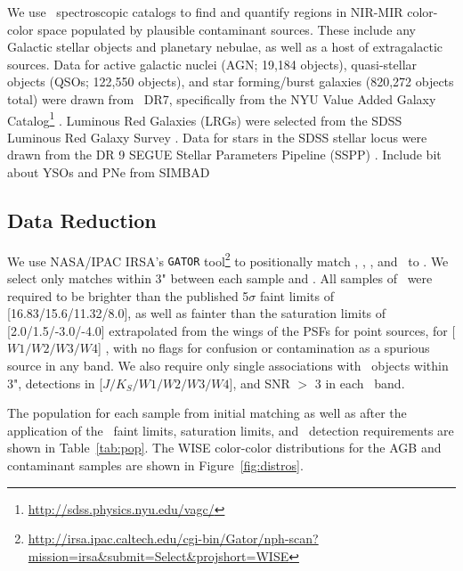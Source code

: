 We use \sdss\, spectroscopic catalogs to find and quantify regions in NIR-MIR color-color space populated by plausible contaminant sources. These include any Galactic stellar objects and planetary nebulae, as well as a host of extragalactic sources. Data for active galactic nuclei (AGN; 19,184 objects), quasi-stellar objects (QSOs; 122,550 objects), and star forming/burst galaxies (820,272 objects total) were drawn from \sdss\, DR7, specifically from the NYU Value Added Galaxy Catalog\footnote{\url{http://sdss.physics.nyu.edu/vagc/}} \citep[VAGC]{2005AJ....129.2562B}. Luminous Red Galaxies (LRGs) were selected from the SDSS Luminous Red Galaxy Survey \citep[105,631 objects, ][]{2010ApJ...710.1444K}.  Data for stars in the SDSS stellar locus were drawn from the DR 9 SEGUE Stellar Parameters Pipeline (SSPP) \citep[1,843,190 objects, ][]{2012ApJS..203...21A}. {\color{red} Include bit about YSOs and PNe from SIMBAD}

\subsection{Data Reduction}
\label{sec:reduction}
We use NASA/IPAC IRSA's {\tt GATOR} tool\footnote{\url{http://irsa.ipac.caltech.edu/cgi-bin/Gator/nph-scan?mission=irsa&submit=Select&projshort=WISE}} to positionally match \sdss, \ogle, \macho, and \simbad\, to \allwise. We select only matches within 3" between  each sample and \allwise. All samples of \agb\, were required to be brighter than the published 5$\sigma$ faint limits of [16.83/15.6/11.32/8.0], as well as fainter than the saturation limits of [2.0/1.5/-3.0/-4.0] extrapolated from the wings of the PSFs for point sources, for [$W1/W2/W3/W4$] \citep{2013wise.rept....1C}, with no flags for confusion or contamination as a spurious source in any band. We also require only single associations with \twomass\, objects within 3", detections in [$J/K_S/W1/W2/W3/W4$], and SNR $>$ 3 in each \allwise\, band. 

The population for each sample from initial matching as well as after the application of the \allwise\, faint limits, saturation limits, and \twomass\, detection requirements are shown in Table~\ref{tab:pop}. The WISE color-color distributions for the AGB and contaminant samples are shown in Figure~\ref{fig:distros}. \\

